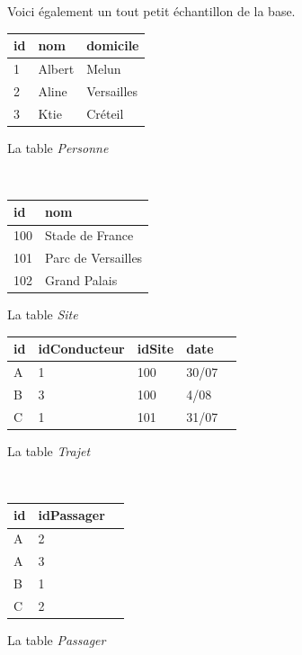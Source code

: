 \documentclass[10pt,a4paper]{article}
\newcommand{\cle}[1]{\textbf{#1}}
\def\tble#1{\textit{#1}}
\begin{document}
\vspace*{0.2cm}

Voici également un tout petit échantillon de la base.

\vspace*{0.2cm}
\begin{center}
\begin{minipage}[b]{4cm}
\begin{tabular}{l|l|l}
\cle{id} & nom & domicile\\
\hline
1 & Albert & Melun\\
2 & Aline & Versailles\\
3 & Ktie & Créteil\\
\hline
\end{tabular}

\centerline{La table \tble{Personne}}
\end{minipage} \hspace*{0.5cm} \
\begin{minipage}[b]{3cm}
\begin{tabular}{l|l}
\cle{id} &  nom  \\
\hline
100 & Stade de France\\
101 & Parc de Versailles \\
102 & Grand Palais \\
\hline
\end{tabular}

\centerline{La table \tble{Site}}
\end{minipage} 

\vspace*{0.5cm}
\begin{minipage}[b]{6cm}
\begin{tabular}{l|l|l|l|l}
\cle{id} & idConducteur & idSite & date \\
\hline
A & 1 & 100 & 30/07 \\
B & 3 & 100 & 4/08 \\
C & 1 & 101 & 31/07 \\
\hline
\end{tabular}

\centerline{La table \tble{Trajet}}
\end{minipage} \hspace*{0.5cm} \
\begin{minipage}[b]{3cm}
\begin{tabular}{l|l|l}
\cle{id} &  idPassager  \\
\hline
A & 2 \\
A & 3 \\
B & 1 \\
C & 2 \\
\hline
\end{tabular}

\centerline{La table \tble{Passager}}
\end{minipage} 
\end{center}
\end{document}
